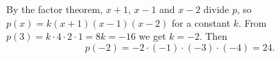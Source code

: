 By the factor theorem, $x+1$, $x-1$ and $x-2$ divide $p$, so $p(x)=k(x+1)(x-1)(x-2)$ for a constant $k$. From $p(3)=k\cdot4\cdot2\cdot1=8k=-16$ we get $k=-2$. Then
\[p(-2)=-2\cdot(-1)\cdot(-3)\cdot(-4)=\boxed{24}.\]
